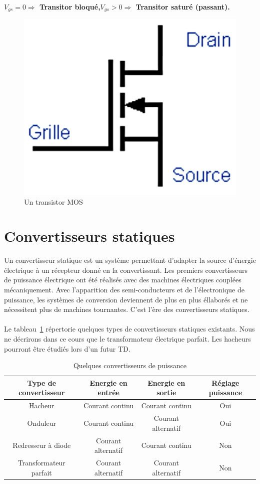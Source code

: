\documentclass[10pt,fleqn]{article} %
\begin{document}
  \begin{aretenir}
    \textbf{$V_{gs} =0 \Rightarrow$ Transitor bloqué,\hfill $V_{gs} >0 \Rightarrow$ Transitor saturé (passant).}
  \end{aretenir}

  \begin{figure}[h]
    \centering
    \includegraphics[width=.2\textwidth]{images/mos}
    \caption{Un transistor MOS}
    \label{}
  \end{figure}

\section{Convertisseurs statiques}
  Un convertisseur statique est un système permettant d'adapter la source d'énergie électrique à un récepteur donné en la convertissant.
  Les premiers convertisseurs de puissance électrique ont été réalisés avec des machines électriques couplées mécaniquement.
  Avec l'apparition des semi-conducteurs et de l'électronique de puissance,
  les systèmes de conversion deviennent de plus en plus éllaborés et ne nécessitent plus de machines tournantes. C'est l'ère des convertisseurs statiques.


  \paragraph{}
  Le tableau~\ref{tab:convertisseur} répertorie quelques types de convertisseurs statiques existants. Nous ne décrirons dans ce cours que le transformateur électrique parfait. Les hacheurs pourront être étudiés lors d'un futur TD.

  \begin{table}[h]
    \centering
    \begin{tabular}{c|c|c|c}
      \textbf{Type de convertisseur} & \textbf{Energie en entrée}&\textbf{Energie en sortie} &\textbf{Réglage puissance }\\\hline \hline
      Hacheur                 & Courant continu     & Courant continu     & Oui \\\hline
      Onduleur               & Courant continu     & Courant alternatif  & Oui \\\hline
      Redresseur à diode      & Courant alternatif  & Courant continu     & Non \\\hline
      Transformateur parfait  & Courant alternatif  & Courant alternatif  & Non \\
    \end{tabular}
    \caption{Quelques convertisseurs de puissance}
    \label{tab:convertisseur}

  \end{table}
\end{document}
